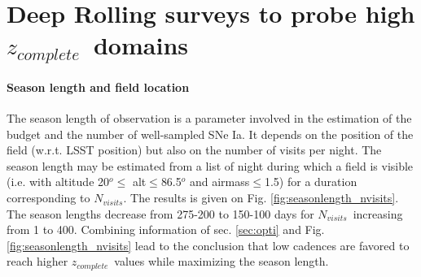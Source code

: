 \documentclass[skiphelvet,twocolumn]{lsstdescnote}
\newcommand{\snrb}{\mbox{$SNR^b$}}
\newcommand{\sne}{{SNe Ia}}
\newcommand{\zcomp}{\mbox{$z_{complete}$}}
\newcommand{\nvisits}{$N_{visits}$}
\begin{document}

\section{Deep Rolling surveys to probe high \zcomp~domains}
\label{sec:scenario}
\paragraph{Season length and field location}
The season length of observation is a parameter involved in the estimation of the budget and the number of well-sampled \sne.  It depends on the position of the field (w.r.t. LSST position) but also on the number of visits per night. The season length may be estimated from a list of night during which a field is visible (i.e. with altitude 20$^o\leq$ alt$\leq$86.5$^o$ and airmass$\leq$1.5) for a duration corresponding to \nvisits.  The results is given on Fig. \ref{fig:seasonlength_nvisits}. The season lengths decrease from 275-200 to 150-100 days for \nvisits~increasing from 1 to 400.  Combining information of sec. \ref{sec:opti} and Fig. \ref{fig:seasonlength_nvisits} lead to the conclusion that low cadences are favored to reach higher \zcomp~values while maximizing the season length.
\end{document}
